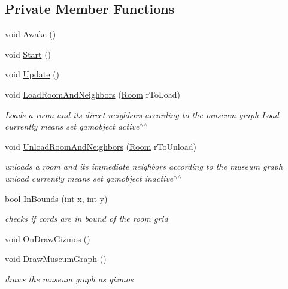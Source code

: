 \subsection*{Private Member Functions}
\begin{DoxyCompactItemize}
\item 
void \mbox{\hyperlink{class_museum_controller_a410c60188546e65ea43c8d7c85cc0713}{Awake}} ()
\item 
void \mbox{\hyperlink{class_museum_controller_a3c48dd82fe1c3b55ee978ced6095f84e}{Start}} ()
\item 
void \mbox{\hyperlink{class_museum_controller_adfeaf699686c1a1aad33bd585db636b9}{Update}} ()
\item 
void \mbox{\hyperlink{class_museum_controller_a8f4312e1b672427e94e590e499d2ca8d}{Load\+Room\+And\+Neighbors}} (\mbox{\hyperlink{class_room}{Room}} r\+To\+Load)
\begin{DoxyCompactList}\small\item\em Loads a room and it\textquotesingle{}s direct neighbors according to the museum graph Load currently means set gamobject active$^\wedge$$^\wedge$ \end{DoxyCompactList}\item 
void \mbox{\hyperlink{class_museum_controller_aa65b2ea9f99d62431282233f0582fc4a}{Unload\+Room\+And\+Neighbors}} (\mbox{\hyperlink{class_room}{Room}} r\+To\+Unload)
\begin{DoxyCompactList}\small\item\em unloads a room and it\textquotesingle{}s immediate neighbors according to the museum graph unload currently means set gamobject inactive$^\wedge$$^\wedge$ \end{DoxyCompactList}\item 
bool \mbox{\hyperlink{class_museum_controller_a5b242d5604840f35efb90e4b645829fe}{In\+Bounds}} (int x, int y)
\begin{DoxyCompactList}\small\item\em checks if cords are in bound of the room grid \end{DoxyCompactList}\item 
void \mbox{\hyperlink{class_museum_controller_a09d2311468a7d9359368ddb266cdf898}{On\+Draw\+Gizmos}} ()
\item 
void \mbox{\hyperlink{class_museum_controller_a35d0940d2ad548791dda37d371132124}{Draw\+Museum\+Graph}} ()
\begin{DoxyCompactList}\small\item\em draws the museum graph as gizmos \end{DoxyCompactList}\end{DoxyCompactItemize}
